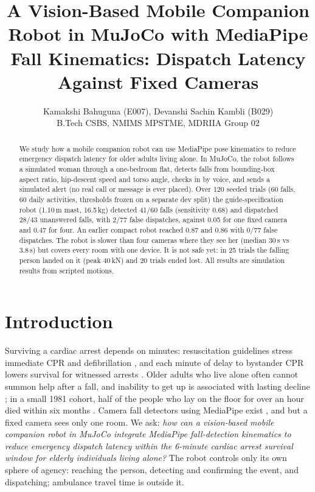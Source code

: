 \documentclass[11pt,twocolumn]{article}
\begin{document}
\linespread{1.05}\selectfont
\title{\vspace{-0.4in}\large\bfseries A Vision-Based Mobile Companion Robot in MuJoCo with MediaPipe Fall Kinematics: Dispatch Latency Against Fixed Cameras\vspace{-0.1in}}
\author{\small Kamakshi Bahuguna (E007), Devanshi Sachin Kambli (B029)\\\small B.Tech CSBS, NMIMS MPSTME, MDRIIA Group 02}
\date{}
\maketitle\vspace{-0.3in}
\begin{abstract}
We study how a mobile companion robot can use MediaPipe pose kinematics to reduce emergency dispatch latency for older adults living alone. In MuJoCo, the robot follows a simulated woman through a one-bedroom flat, detects falls from bounding-box aspect ratio, hip-descent speed and torso angle, checks in by voice, and sends a simulated alert (no real call or message is ever placed). Over 120 seeded trials (60 falls, 60 daily activities, thresholds frozen on a separate dev split) the guide-specification robot (1.10\,m mast, 16.5\,kg) detected 41/60 falls (sensitivity 0.68) and dispatched 28/43 unanswered falls, with 2/77 false dispatches, against 0.05 for one fixed camera and 0.47 for four. An earlier compact robot reached 0.87 and 0.86 with 0/77 false dispatches. The robot is slower than four cameras where they see her (median 30\,s vs 3.8\,s) but covers every room with one device. It is not safe yet: in 25 trials the falling person landed on it (peak 40\,kN) and 20 trials ended lost. All results are simulation results from scripted motions.
\end{abstract}
\section{Introduction}
Surviving a cardiac arrest depends on minutes: resuscitation guidelines stress immediate CPR and defibrillation \cite{aha}, and each minute of delay to bystander CPR lowers survival for witnessed arrests \cite{nguyen}. Older adults who live alone often cannot summon help after a fall, and inability to get up is associated with lasting decline \cite{tinetti}; in a small 1981 cohort, half of the people who lay on the floor for over an hour died within six months \cite{wild}. Camera fall detectors using MediaPipe exist \cite{kothari}, and but a fixed camera sees only one room. We ask: \emph{how can a vision-based mobile companion robot in MuJoCo integrate MediaPipe fall-detection kinematics to reduce emergency dispatch latency within the 6-minute cardiac arrest survival window for elderly individuals living alone?} The robot controls only its own sphere of agency: reaching the person, detecting and confirming the event, and dispatching; ambulance travel time is outside it.
\end{document}
